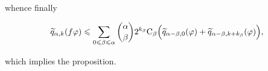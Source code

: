 whence finally

\[
\widetilde {q} _ {\alpha , k} (f \varphi) \leqslant \sum_ {0 \leqslant \beta \leqslant \alpha} \binom {\alpha} {\beta} 2 ^ {k _ {\beta}} \mathrm{C} _ {\beta} \Bigl (\widetilde {q} _ {\alpha - \beta , 0} (\varphi) + \widetilde {q} _ {\alpha - \beta , k + k _ {\beta}} (\varphi) \Bigr),
\]

which implies the proposition.

